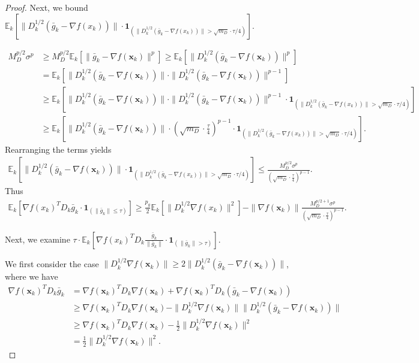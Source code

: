 \documentclass[10pt,a4paper]{amsart}
\newcommand{\barg}{\bar{g}}
\newcommand{\bx}{\boldsymbol{x}}
\begin{document}
\begin{proof}
Next, we bound $\mathbb{E}_k[\|D_k^{1/2} (\bar{g}_k - \nabla f(x_k))\| \cdot \boldsymbol{1}_{(\|D_k^{1/2}(\bar{g}_k - \nabla f(x_k))\|> \sqrt{m_D}\cdot\tau/4)}]$.

\begin{align*}
    M_D^{p/2} \sigma^p & \geq M_D^{p/2}\mathbb{E}_k[\|\barg_k-\nabla f(\bx_k)\|^p]\geq \mathbb{E}_k[\|D_k^{1/2}(\barg_k-\nabla f(\bx_k))\|^p] \\
    & = \mathbb{E}_k[\|D_k^{1/2}(\barg_k-\nabla f(\bx_k))\| \cdot \|D_k^{1/2}(\barg_k-\nabla f(\bx_k))\|^{p-1}] \\
    & \geq \mathbb{E}_k[\|D_k^{1/2}(\barg_k-\nabla f(\bx_k))\| \cdot \|D_k^{1/2}(\barg_k-\nabla f(\bx_k))\|^{p-1}\cdot \boldsymbol{1}_{(\|D_k^{1/2}(\bar{g}_k - \nabla f(x_k))\|> \sqrt{m_D}\cdot\tau/4)}] \\
    & \geq \mathbb{E}_k[\|D_k^{1/2}(\barg_k-\nabla f(\bx_k))\| \cdot \left(\sqrt{m_D}\cdot\frac{\tau}{4}\right)^{p-1}\cdot \boldsymbol{1}_{(\|D_k^{1/2}(\bar{g}_k - \nabla f(x_k))\|> \sqrt{m_D}\cdot\tau/4)}].
\end{align*}
Rearranging the terms yields
\begin{align*}
    \mathbb{E}_k[\|D_k^{1/2}(\barg_k-\nabla f(\bx_k))\|  \cdot \boldsymbol{1}_{(\|D_k^{1/2}(\bar{g}_k - \nabla f(x_k))\|> \sqrt{m_D}\cdot\tau/4)}] \leq \frac{M_D^{p/2} \sigma^p}{\left(\sqrt{m_D}\cdot\frac{\tau}{4}\right)^{p-1}}.
\end{align*}
Thus
\begin{align*}
    \mathbb{E}_k[\nabla f(x_k)^T D_k \bar{g}_k \cdot \boldsymbol{1}_{(\|\bar{g}_k\| \le \tau)}]
    \geq \frac{p_g}{2}\mathbb{E}_k[\| D_k^{1/2} \nabla f(x_k)\|^2] -  \|\nabla f(\bx_k)\|\frac{M_D^{p/2+1} \sigma^p}{\left(\sqrt{m_D}\cdot\frac{\tau}{4}\right)^{p-1}} .
\end{align*}

Next, we examine $\tau \cdot \mathbb{E}_k\left[\nabla f(x_k)^T D_k \frac{\bar{g}_k}{\|\bar{g}_k\|} \cdot \boldsymbol{1}_{(\|\bar{g}_k\| > \tau)} \right]$.

We first consider the case $\|D_k^{1/2}\nabla f(\bx_k)\|\geq 2\|D_k^{1/2}(\barg_k-\nabla f(\bx_k))\|$, where we have
\begin{align*}
    \nabla f(\bx_k)^TD_k\barg_k 
    &= \nabla f(\bx_k)^TD_k\nabla f(\bx_k) +\nabla f(\bx_k)^TD_k (\barg_k - \nabla f(\bx_k)) \\
    & \geq \nabla f(\bx_k)^TD_k\nabla f(\bx_k) - \|D_k^{1/2}\nabla f(\bx_k)\|\|D_k^{1/2} (\barg_k - \nabla f(\bx_k))\| \\
    & \geq \nabla f(\bx_k)^TD_k\nabla f(\bx_k) - \frac{1}{2}\|D_k^{1/2}\nabla f(\bx_k)\|^2 \\
    & = \frac{1}{2}\|D_k^{1/2}\nabla f(\bx_k)\|^2.
\end{align*}


\end{proof}
\end{document}
